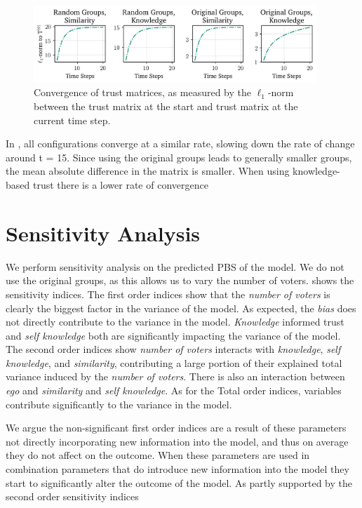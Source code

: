 \begin{figure}[ht]
	\begin{center}
		\includegraphics[width=0.95\textwidth]{Figures/convergence_groups.png}
	\end{center}
	\caption{Convergence of trust matrices, as measured by the $\ell_1$-norm between the trust matrix at the start and  trust matrix at the current time step.}\label{fig:convergence_big}
\end{figure}

In , all configurations converge at a
similar rate, slowing down the rate of change around t = 15. Since using the
original groups leads to generally smaller groups, the mean absolute difference in
the matrix is smaller. When using knowledge-based trust there is a lower rate
of convergence




\section{Sensitivity Analysis} We perform sensitivity analysis on the predicted
PBS of the model. We do not use the original groups, as this allows us to vary
the number of voters.  shows the sensitivity indices.
The first order indices show that the \textit{number
	of voters} is clearly the biggest factor in the variance of the model. As
expected, the \textit{bias} does not directly contribute to the variance in the
model. \textit{Knowledge} informed trust and \textit{self knowledge}
both are significantly impacting the variance of the model.
The second order indices show \textit{number of voters} interacts with
\textit{knowledge}, \textit{self knowledge}, and\textit{ similarity},
contributing a large portion of their explained total variance induced by the
\textit{number of voters}. There is also an interaction between \textit{ego}
and \textit{similarity} and \textit{self knowledge}. As for the Total order
indices, variables contribute significantly to the variance in the
model.

We argue the non-significant first order indices are a result of these
parameters not directly incorporating new information into the model, and thus
on average they do not affect on the outcome. When these parameters are used in
combination parameters that do introduce new information into the model they
start to significantly alter the outcome of the model. As partly supported by
the second order sensitivity indices

